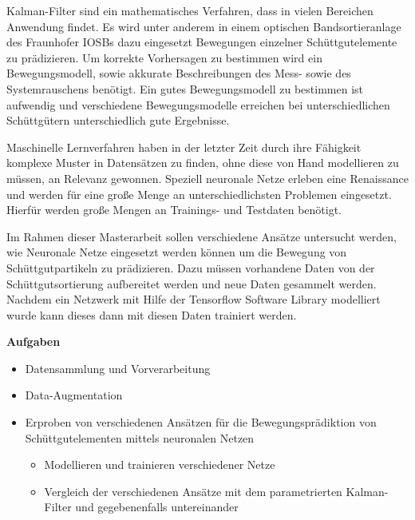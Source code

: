 \documentclass [a4paper, 10pt]{scrartcl}
\begin{document}
\Anfang
Kalman-Filter sind ein mathematisches Verfahren, dass in vielen Bereichen Anwendung findet. 
Es wird unter anderem in einem optischen Bandsortieranlage des Fraunhofer IOSBs dazu eingesetzt Bewegungen einzelner Schüttgutelemente zu prädizieren.
Um korrekte Vorhersagen zu bestimmen wird ein Bewegungsmodell, sowie akkurate Beschreibungen des Mess- sowie des Systemrauschens benötigt.
Ein gutes Bewegungsmodell zu bestimmen ist aufwendig und verschiedene Bewegungsmodelle erreichen bei unterschiedlichen Schüttgütern unterschiedlich gute Ergebnisse.


Maschinelle Lernverfahren haben in der letzter Zeit durch ihre Fähigkeit 
komplexe Muster in Datensätzen zu finden, ohne diese von Hand modellieren zu müssen, an Relevanz gewonnen.
Speziell neuronale Netze erleben eine Renaissance und werden für eine große Menge an unterschiedlichsten Problemen eingesetzt.
Hierfür werden große Mengen an Trainings- und Testdaten benötigt. 

Im Rahmen dieser Masterarbeit sollen verschiedene Ansätze untersucht werden, wie Neuronale Netze eingesetzt werden können um die Bewegung von Schüttgutpartikeln zu prädizieren.
Dazu müssen vorhandene Daten von der Schüttgutsortierung aufbereitet werden und neue Daten gesammelt werden.
Nachdem ein Netzwerk mit Hilfe der Tensorflow Software Library modelliert wurde kann dieses dann mit diesen Daten trainiert werden.





\textbf{Aufgaben}
\begin{itemize}
  \item Datensammlung und Vorverarbeitung
  \item Data-Augmentation
  \item Erproben von verschiedenen Ansätzen für die Bewegungsprädiktion von Schüttgutelementen mittels neuronalen Netzen
  	\begin{itemize}
  		\item Modellieren und trainieren verschiedener Netze
  		\item Vergleich der verschiedenen Ansätze mit dem parametrierten Kalman-Filter und gegebenenfalls untereinander
  	\end{itemize}
\end{itemize}
\Ende
\end{document}
